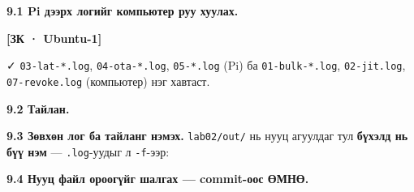 \textbf{9.1 Pi дээрх логийг компьютер руу хуулах.}

\textbf{{[}ЗК · Ubuntu-1{]}}

\begin{Shaded}
\begin{Highlighting}[]
 
\end{Highlighting}
\end{Shaded}

✓ \texttt{03-lat-*.log}, \texttt{04-ota-*.log}, \texttt{05-*.log} (Pi) ба \texttt{01-bulk-*.log}, \texttt{02-jit.log}, \texttt{07-revoke.log} (компьютер) нэг хавтаст.

\textbf{9.2 Тайлан.}

\begin{Shaded}
\begin{Highlighting}[]
\end{Highlighting}
\end{Shaded}

\textbf{9.3 Зөвхөн лог ба тайланг нэмэх.} \texttt{lab02/out/} нь нууц агуулдаг тул \textbf{бүхэлд нь бүү нэм} --- \texttt{.log}-уудыг л \texttt{-f}-ээр:

\begin{Shaded}
\begin{Highlighting}[]
\end{Highlighting}
\end{Shaded}

\textbf{9.4 Нууц файл ороогүйг шалгах --- commit-оос ӨМНӨ.}

\begin{Shaded}
\begin{Highlighting}[]
\KeywordTok{|} 
\KeywordTok{|} 
\end{Highlighting}
\end{Shaded}

